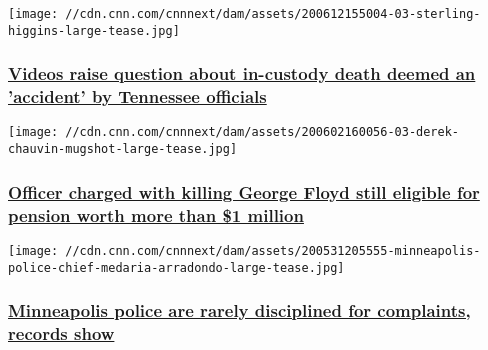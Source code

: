 \href{/2020/06/12/us/videos-jail-custody-death-sterling-higgins-invs/index.html}{}

\texttt{[image: //cdn.cnn.com/cnnnext/dam/assets/200612155004-03-sterling-higgins-large-tease.jpg]}

\hypertarget{videos-raise-question-about-in-custody-death-deemed-an-accident-by-tennessee-officials}{%
\subsubsection{\texorpdfstring{\href{/2020/06/12/us/videos-jail-custody-death-sterling-higgins-invs/index.html}{Videos
raise question about in-custody death deemed an 'accident' by Tennessee
officials}}{Videos raise question about in-custody death deemed an 'accident' by Tennessee officials}}\label{videos-raise-question-about-in-custody-death-deemed-an-accident-by-tennessee-officials}}

\href{/2020/06/12/us/chauvin-minneapolis-police-pension-invs/index.html}{}

\texttt{[image: //cdn.cnn.com/cnnnext/dam/assets/200602160056-03-derek-chauvin-mugshot-large-tease.jpg]}

\hypertarget{officer-charged-with-killing-george-floyd-still-eligible-for-pension-worth-more-than-1-million-}{%
\subsubsection{\texorpdfstring{\href{/2020/06/12/us/chauvin-minneapolis-police-pension-invs/index.html}{Officer
charged with killing George Floyd still eligible for pension worth more
than \$1 million
}}{Officer charged with killing George Floyd still eligible for pension worth more than \$1 million }}\label{officer-charged-with-killing-george-floyd-still-eligible-for-pension-worth-more-than-1-million-}}

\href{/2020/06/11/us/minneapolis-police-discipline-invs/index.html}{}

\texttt{[image: //cdn.cnn.com/cnnnext/dam/assets/200531205555-minneapolis-police-chief-medaria-arradondo-large-tease.jpg]}

\hypertarget{minneapolis-police-are-rarely-disciplined-for-complaints-records-show}{%
\subsubsection{\texorpdfstring{\href{/2020/06/11/us/minneapolis-police-discipline-invs/index.html}{Minneapolis
police are rarely disciplined for complaints, records
show}}{Minneapolis police are rarely disciplined for complaints, records show}}\label{minneapolis-police-are-rarely-disciplined-for-complaints-records-show}}

